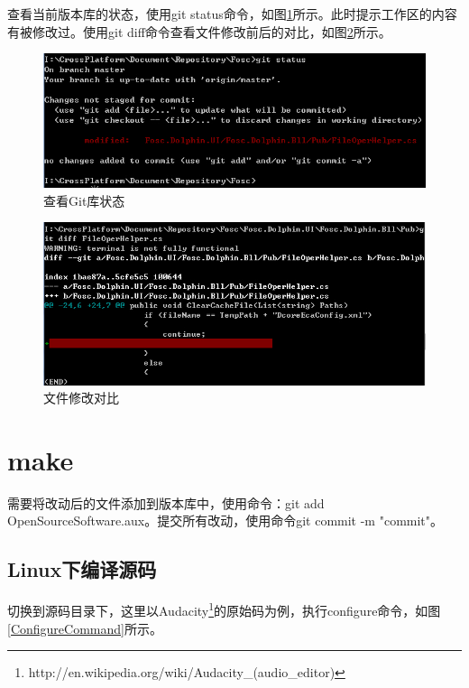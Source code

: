 \documentclass[paper=a4,fontsize=11pt]{article}
\begin{document}
	查看当前版本库的状态，使用git status命令，如图\ref{GitRepositoryStatus}所示。此时提示工作区的内容有被修改过。使用git diff命令查看文件修改前后的对比，如图\ref{GitDiffFileOperation}所示。
	
	\begin{figure}[htbp]
		\centering
		\includegraphics[scale=0.8]{GitRepositoryStatus.jpg}
		\caption{查看Git库状态}
		\label{GitRepositoryStatus}
	\end{figure}
	
	
		\begin{figure}[htbp]
			\centering
			\includegraphics[scale=0.8]{GitDiffFileOperation.jpg}
			\caption{文件修改对比}
			\label{GitDiffFileOperation}
		\end{figure}
	\section{make}	
	
	需要将改动后的文件添加到版本库中，使用命令：git add OpenSourceSoftware.aux。提交所有改动，使用命令git commit -m "commit"。
	
	\subsection{Linux下编译源码}	
	
	切换到源码目录下，这里以Audacity\footnote{http://en.wikipedia.org/wiki/Audacity\_(audio\_editor)}的原始码为例，执行configure命令，如图\ref{ConfigureCommand}所示。	
	
\end{document}
